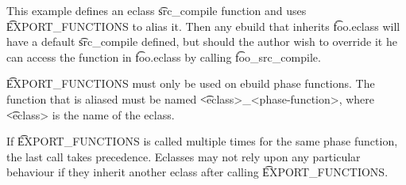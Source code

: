 This example defines an eclass \t{src_compile} function and uses \t{EXPORT_FUNCTIONS} to alias
it. Then any ebuild that inherits \t{foo.eclass} will have a default \t{src_compile} defined, but
should the author wish to override it he can access the function in \t{foo.eclass} by calling
\t{foo_src_compile}.

\t{EXPORT_FUNCTIONS} must only be used on ebuild phase functions. The function that is aliased
must be named \t{<eclass>_<phase-function>}, where \t{<eclass>} is the name of the eclass.

If \t{EXPORT_FUNCTIONS} is called multiple times for the same phase function, the last call takes
precedence. Eclasses may not rely upon any particular behaviour if they inherit another eclass
after calling \t{EXPORT_FUNCTIONS}.


